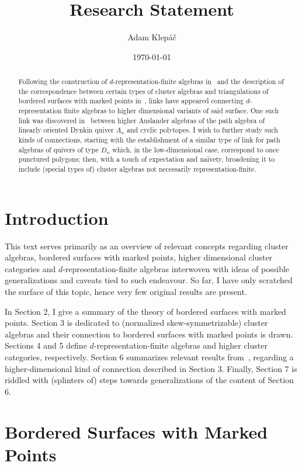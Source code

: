 \documentclass[a4paper,oneside,svgnames,draft]{amsart}
\title{Research Statement}
\author{Adam Klepáč}
\date{\today}
\theoremstyle{plain}
\theoremstyle{definition}
\begin{document}
 \maketitle
 \begin{abstract}
  Following the construction of $d$-representation-finite algebras
  in~\cite{iyama} and the description of the correspondence between certain
  types of cluster algebras and triangulations of bordered surfaces with marked
  points in~\cite{fst}, links have appeared connecting $d$-representation finite
  algebras to higher dimensional variants of said surface. One such link was
  discovered in~\cite{ot} between higher Auslander algebras of the path algebra
  of linearly oriented Dynkin quiver $A_n$ and cyclic polytopes. I wish to
  further study such kinds of connections, starting with the establishment of a
  similar type of link for path algebras of quivers of type $D_n$ which, in the
  low-dimensional case, correspond to once punctured polygons; then, with a
  touch of expectation and naïvety, broadening it to include (special types of)
  cluster algebras not necessarily representation-finite.
 \end{abstract}

 \section{Introduction}
 \label{sec:introduction}

 This text serves primarily as an overview of relevant concepts regarding
 cluster algebras, bordered surfaces with marked points, higher dimensional
 cluster categories and $d$-representation-finite algebras interwoven with ideas
 of possible generalizations and caveats tied to such endeavour. So far, I have
 only scratched the surface of this topic, hence very few original results are
 present.

 In Section 2, I give a summary of the theory of bordered surfaces with marked
 points. Section 3 is dedicated to (normalized skew-symmetrizable) cluster
 algebras and their connection to bordered surfaces with marked points is drawn.
 Sections 4 and 5 define $d$-representation-finite algebras and higher cluster
 categories, respectively. Section 6 summarizes relevant results
 from~\cite{ot}, regarding a higher-dimensional kind of connection described in
 Section 3. Finally, Section 7 is riddled with (splinters of) steps towards
 generalizations of the content of Section 6.

 \section{Bordered Surfaces with Marked Points}
 \label{sec:bordered-surfaces-with-marked-points}
\end{document}
